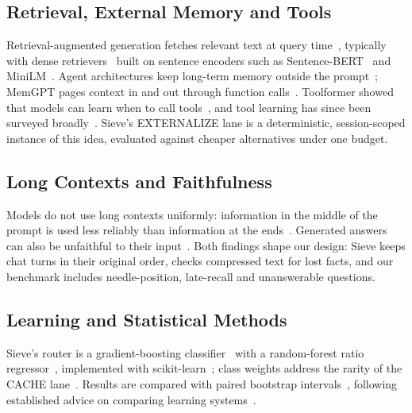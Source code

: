 \documentclass[journal]{IEEEtran}
\begin{document}
\subsection{Retrieval, External Memory and Tools}
Retrieval-augmented generation fetches relevant text at query time~\cite{huang2026ragsurvey,zhu2025irsurvey}, typically with dense
retrievers~\cite{zhao2024dense} built on sentence encoders such as Sentence-BERT~\cite{reimers2019sbert} and
MiniLM~\cite{wang2020minilm}. Agent architectures keep long-term memory outside the prompt~\cite{zhang2025memory,wang2024agents,xi2025agents};
MemGPT pages context in and out through function calls~\cite{packer2023memgpt}. Toolformer showed that models can learn when to
call tools~\cite{schick2023toolformer}, and tool learning has since been surveyed broadly~\cite{qin2024tool}. Sieve's EXTERNALIZE
lane is a deterministic, session-scoped instance of this idea, evaluated against cheaper alternatives under one budget.

\subsection{Long Contexts and Faithfulness}
Models do not use long contexts uniformly: information in the middle of the prompt is used less reliably than information at the
ends~\cite{liu2024lost}. Generated answers can also be unfaithful to their input~\cite{ji2023hallucination,huang2025hallucination}.
Both findings shape our design: Sieve keeps chat turns in their original order, checks compressed text for lost facts, and our
benchmark includes needle-position, late-recall and unanswerable questions.

\subsection{Learning and Statistical Methods}
Sieve's router is a gradient-boosting classifier~\cite{friedman2001gbm} with a random-forest ratio regressor~\cite{breiman2001rf},
implemented with scikit-learn~\cite{pedregosa2011sklearn}; class weights address the rarity of the CACHE lane~\cite{he2009imbalanced}.
Results are compared with paired bootstrap intervals~\cite{efron1979bootstrap}, following established advice on comparing learning
systems~\cite{dietterich1998tests}.
\end{document}
